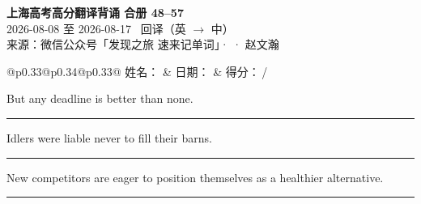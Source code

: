 \documentclass[11pt,a4paper]{article}
\newcommand{\num}[1]{\makebox[1.9em][r]{#1.}\hspace{0.3em}}
\newcommand{\wline}{\noindent\rule{\linewidth}{0.4pt}}
\begin{document}
\pagestyle{plain}
\begin{center}
{\LARGE\bfseries 上海高考高分翻译背诵 \quad 合册 48–57}\\[0.25em]
{\large 2026-08-08 至 2026-08-17 \quad\ 回译（英 $\to$ 中）}\\[0.35em]
{\footnotesize 来源：微信公众号「发现之旅 速来记单词」·  · 赵文瀚}
\end{center}

\vspace{0.4em}
\noindent\begin{tabular}{@{}p{0.33\textwidth}@{}p{0.34\textwidth}@{}p{0.33\textwidth}@{}}
姓名：\underline{\hspace{2.0cm}} & 日期：\underline{\hspace{2.0cm}} & 得分：\underline{\hspace{1.4cm}}\,/ \\
\end{tabular}

\vspace{0.5em}

\vspace{0.8em}
\vspace{0.35em}\vspace{0.15em}

\begin{minipage}{\linewidth}

\num{1}But any deadline is better than none.

\vspace{0.25em}

\wline

\end{minipage}

\begin{minipage}{\linewidth}

\num{2}Idlers were liable never to fill their barns.

\vspace{0.25em}

\wline

\end{minipage}

\begin{minipage}{\linewidth}

\num{3}New competitors are eager to position themselves as a healthier alternative.

\vspace{0.25em}

\wline

\end{minipage}
\end{document}

